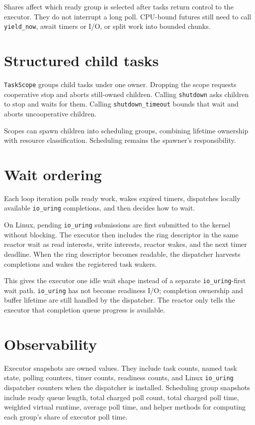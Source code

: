 \begin{notabene}
Shares affect which ready group is selected after tasks return control to the
executor. They do not interrupt a long poll. CPU-bound futures still need to
call \texttt{yield\_now}, await timers or I/O, or split work into bounded
chunks.
\end{notabene}

\section{Structured child tasks}

\texttt{TaskScope} groups child tasks under one owner. Dropping the scope
requests cooperative stop and aborts still-owned children. Calling
\texttt{shutdown} asks children to stop and waits for them. Calling
\texttt{shutdown\_timeout} bounds that wait and aborts uncooperative children.

Scopes can spawn children into scheduling groups, combining lifetime ownership
with resource classification. Scheduling remains the spawner's responsibility.

\section{Wait ordering}

Each loop iteration polls ready work, wakes expired timers, dispatches locally
available \texttt{io\_uring} completions, and then decides how to wait.

On Linux, pending \texttt{io\_uring} submissions are first submitted to the
kernel without blocking. The executor then includes the ring descriptor in the
same reactor wait as read interests, write interests, reactor wakes, and the
next timer deadline. When the ring descriptor becomes readable, the dispatcher
harvests completions and wakes the registered task wakers.

This gives the executor one idle wait shape instead of a separate
\texttt{io\_uring}-first wait path. \texttt{io\_uring} has not become readiness
I/O; completion ownership and buffer lifetime are still handled by the
dispatcher. The reactor only tells the executor that completion queue progress
is available.

\section{Observability}

Executor snapshots are owned values. They include task counts, named task
state, polling counters, timer counts, readiness counts, and Linux
\texttt{io\_uring} dispatcher counters when the dispatcher is installed.
Scheduling group snapshots include ready queue length, total charged poll
count, total charged poll time, weighted virtual runtime, average poll time,
and helper methods for computing each group's share of executor poll time.

